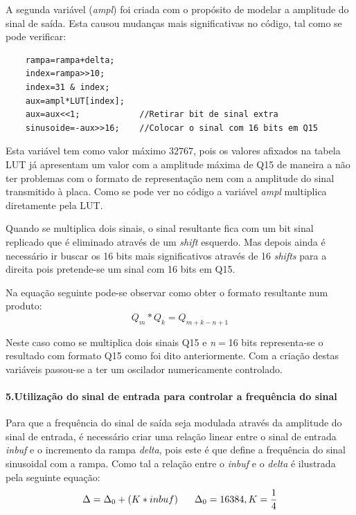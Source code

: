 \documentclass[11pt]{article}
\numberwithin{equation}{section}
\begin{document}
	A segunda variável (\textit{ampl}) foi criada com o propósito de modelar a amplitude do sinal de saída. Esta causou mudanças mais significativas no código, tal como se pode verificar:
	\begin{lstlisting}
	rampa=rampa+delta;
	index=rampa>>10;
	index=31 & index;        
	aux=ampl*LUT[index];
	aux=aux<<1;            //Retirar bit de sinal extra
	sinusoide=-aux>>16;    //Colocar o sinal com 16 bits em Q15
	\end{lstlisting}
	
	Esta variável tem como valor máximo $ 32767 $, pois os valores afixados na tabela LUT já apresentam um valor com a amplitude máxima de Q15 de maneira a não ter problemas com o formato de representação nem com a amplitude do sinal transmitido à placa.
	Como se pode ver no código a variável \textit{ampl} multiplica diretamente pela LUT. 
	\vspace{2 mm}
	
	Quando se multiplica dois sinais, o sinal resultante fica com um bit sinal replicado que é eliminado através de um \textit{shift} esquerdo. Mas depois ainda é necessário ir buscar os 16 bits mais significativos através de 16 \textit{shifts} para a direita pois pretende-se um sinal com 16 bits em Q15. 
	
	Na equação seguinte pode-se observar como obter o formato resultante num produto:
	\begin{equation}
	Q_{m} * Q_{k}=Q_{m+k-n+1}
	\end{equation}
	
	Neste caso como se multiplica dois sinais Q15 e \textit{n}$=$16 bits representa-se o resultado com formato Q15 como foi dito anteriormente.
	Com a criação destas variáveis passou-se a ter um oscilador numericamente controlado.
	\paragraph{5.Utilização do sinal de entrada para controlar a frequência do sinal} \hspace{0pt}
	\label{p1-5}
	
	Para que a frequência do sinal de saída seja modulada através da amplitude do sinal de entrada, é necessário criar uma relação linear entre o sinal de entrada \textit{inbuf} e o incremento da rampa \textit{delta}, pois este é que define a frequência do sinal sinusoidal com a rampa. Como tal a relação entre o \textit{inbuf} e o \textit{delta} é ilustrada pela seguinte equação:
	\begin{equation}
	\Delta=\Delta_0+(K*inbuf)	\hspace{6 mm}\Delta_0=16384, K=\frac{1}{4}
	\label{delta}
	\end{equation}
	
\end{document}
